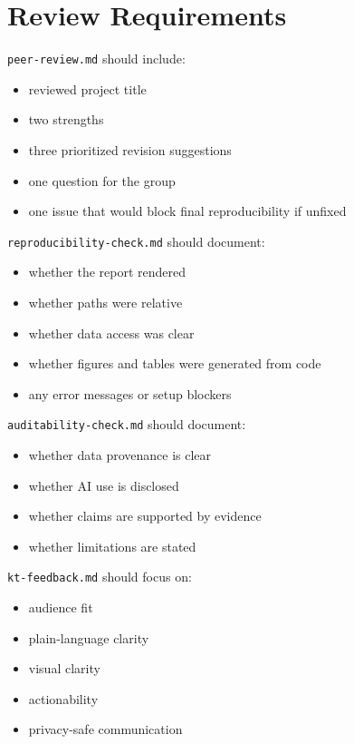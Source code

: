 \documentclass[
  letterpaper,
  DIV=11,
  numbers=noendperiod,
  oneside]{scrreprt}
\providecommand{\tightlist}{%
  \setlength{\itemsep}{0pt}\setlength{\parskip}{0pt}}
\begin{document}
\section{Review Requirements}\label{review-requirements}

\texttt{peer-review.md} should include:

\begin{itemize}
\tightlist
\item
  reviewed project title
\item
  two strengths
\item
  three prioritized revision suggestions
\item
  one question for the group
\item
  one issue that would block final reproducibility if unfixed
\end{itemize}

\texttt{reproducibility-check.md} should document:

\begin{itemize}
\tightlist
\item
  whether the report rendered
\item
  whether paths were relative
\item
  whether data access was clear
\item
  whether figures and tables were generated from code
\item
  any error messages or setup blockers
\end{itemize}

\texttt{auditability-check.md} should document:

\begin{itemize}
\tightlist
\item
  whether data provenance is clear
\item
  whether AI use is disclosed
\item
  whether claims are supported by evidence
\item
  whether limitations are stated
\end{itemize}

\texttt{kt-feedback.md} should focus on:

\begin{itemize}
\tightlist
\item
  audience fit
\item
  plain-language clarity
\item
  visual clarity
\item
  actionability
\item
  privacy-safe communication
\end{itemize}
\end{document}
